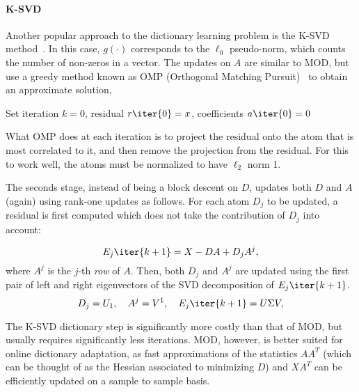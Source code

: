\documentclass[a4paper,11pt]{article}
\begin{document}
\paragraph{K-SVD} Another popular approach to the dictionary learning problem is the  K-SVD method~\cite{ksvd}. In this case, $g(\cdot)$ corresponds to the $\ell_0$ pseudo-norm, which counts the number of non-zeros in a vector. The updates on $A$ are similar to MOD, but use a greedy method known as OMP (Orthogonal Matching Pursuit)~\cite{omp} to obtain an approximate solution,


\begin{algorithm}[ht]
Set iteration $k=0$, residual $r\iter{0}=x$, coefficients $a\iter{0}=0$\;
\label{alg:omp}
\end{algorithm}

What OMP does at each iteration is to project the residual onto the atom that is most correlated to it, and then remove the projection from the residual. For this to work well, the atoms must be normalized to have $\ell_2$ norm 1.

The seconds stage, instead of being a block descent on $D$, updates both $D$ and $A$ (again) using rank-one updates as follows. For each atom $D_j$ to be updated, a residual is first computed which does not take the contribution of $D_j$ into account:

\begin{equation}
E_j\iter{k+1} = X - DA + D_jA^j,
\label{eq:ksvd2}
\end{equation}
where $A^j$ is the $j$-th \emph{row} of $A$. Then, both $D_j$ and $A^j$ are updated using the first pair of left and right eigenvectors of the SVD decomposition of $E_j\iter{k+1}$. 
\begin{equation}
D_j = U_1,\quad A^j=V^1,\quad E_j\iter{k+1} = U\Sigma V,
\label{eq:ksvd3}
\end{equation}

The K-SVD dictionary step is significantly more costly than that of MOD, but usually requires significantly less iterations. MOD, however, is better suited for online dictionary adaptation, as fast approximations of the statistics $AA^T$ (which can be thought of as the Hessian associated to minimizing $D$)  and $XA^T$ can be efficiently updated on a sample to sample basis.
\end{document}
